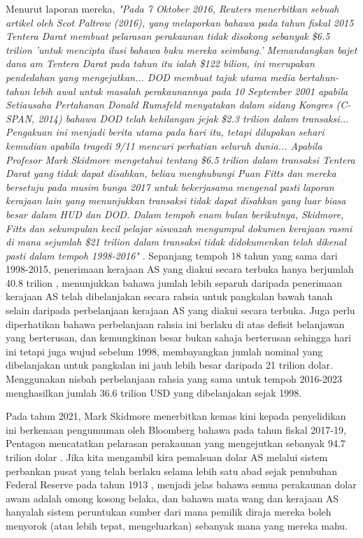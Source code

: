 \documentclass[10pt,twocolumn,letterpaper]{article}
\begin{document}
Menurut laporan mereka, \textit{"Pada 7 Oktober 2016, Reuters menerbitkan sebuah artikel oleh Scot Paltrow (2016), yang melaporkan bahawa pada tahun fiskal 2015 Tentera Darat membuat pelarasan perakaunan tidak disokong sebanyak \$6.5 trilion 'untuk mencipta ilusi bahawa buku mereka seimbang.' Memandangkan bajet dana am Tentera Darat pada tahun itu ialah \$122 bilion, ini merupakan pendedahan yang mengejutkan... DOD membuat tajuk utama media bertahun-tahun lebih awal untuk masalah perakaunannya pada 10 September 2001 apabila Setiausaha Pertahanan Donald Rumsfeld menyatakan dalam sidang Kongres (C-SPAN, 2014) bahawa DOD telah kehilangan jejak \$2.3 trilion dalam transaksi... Pengakuan ini menjadi berita utama pada hari itu, tetapi dilupakan sehari kemudian apabila tragedi 9/11 mencuri perhatian seluruh dunia... Apabila Profesor Mark Skidmore mengetahui tentang \$6.5 trilion dalam transaksi Tentera Darat yang tidak dapat disahkan, beliau menghubungi Puan Fitts dan mereka bersetuju pada musim bunga 2017 untuk bekerjasama mengenal pasti laporan kerajaan lain yang menunjukkan transaksi tidak dapat disahkan yang luar biasa besar dalam HUD dan DOD. Dalam tempoh enam bulan berikutnya, Skidmore, Fitts dan sekumpulan kecil pelajar siswazah mengumpul dokumen kerajaan rasmi di mana sejumlah \$21 trilion dalam transaksi tidak didokumenkan telah dikenal pasti dalam tempoh 1998-2016"} \cite{12}.
Sepanjang tempoh 18 tahun yang sama dari 1998-2015, penerimaan kerajaan AS yang diakui secara terbuka hanya berjumlah 40.8 trilion \cite{15}, menunjukkan bahawa jumlah lebih separuh daripada penerimaan kerajaan AS telah dibelanjakan secara rahsia untuk pangkalan bawah tanah selain daripada perbelanjaan kerajaan AS yang diakui secara terbuka. Juga perlu diperhatikan bahawa perbelanjaan rahsia ini berlaku di atas defisit belanjawan yang berterusan, dan kemungkinan besar bukan sahaja berterusan sehingga hari ini tetapi juga wujud sebelum 1998, membayangkan jumlah nominal yang dibelanjakan untuk pangkalan ini jauh lebih besar daripada 21 trilion dolar. Menggunakan nisbah perbelanjaan rahsia yang sama untuk tempoh 2016-2023 menghasilkan jumlah 36.6 trilion USD yang dibelanjakan sejak 1998.

Pada tahun 2021, Mark Skidmore menerbitkan kemas kini kepada penyelidikan ini berkenaan pengumuman oleh Bloomberg bahawa pada tahun fiskal 2017-19, Pentagon mencatatkan pelarasan perakaunan yang mengejutkan sebanyak 94.7 trilion dolar \cite{17,18}. Jika kita mengambil kira pemalsuan dolar AS melalui sistem perbankan pusat yang telah berlaku selama lebih satu abad sejak penubuhan Federal Reserve pada tahun 1913 \cite{37}, menjadi jelas bahawa semua perakaunan dolar awam adalah omong kosong belaka, dan bahawa mata wang dan kerajaan AS hanyalah sistem peruntukan sumber dari mana pemilik diraja mereka boleh menyorok (atau lebih tepat, mengeluarkan) sebanyak mana yang mereka mahu.
\end{document}
